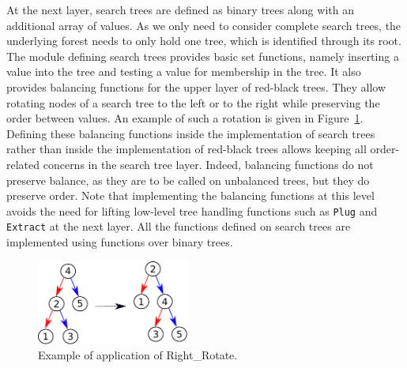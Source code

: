 \documentclass{llncs}
\begin{document}
At the next layer, search trees are defined as binary trees along with an
additional array of values. As we only need to consider complete search trees,
the underlying forest needs to only hold one tree, which is identified through
its root. The module defining search trees provides basic set functions, namely
inserting a value into the tree and testing a value for membership in the
tree. It also provides balancing functions for the upper layer of red-black
trees. They allow rotating nodes of a search tree to the left or to the right
while preserving the order between values. An example of such a rotation is
given in Figure~\ref{fig-search-rot}.  Defining these balancing functions
inside the implementation of search trees rather than inside the implementation
of red-black trees allows keeping all order-related concerns in the search tree
layer. Indeed, balancing functions do not preserve balance, as they are to be
called on unbalanced trees, but they do preserve order. Note that implementing
the balancing functions at this level avoids the need for lifting low-level
tree handling functions such as \texttt{Plug} and \texttt{Extract} at the next
layer. All the functions defined on search trees are implemented using
functions over binary trees.




\begin{figure}[ht]
\begin{center}
\includegraphics[width=5cm]{rotate_right.pdf}
\caption{\label{fig-search-rot} Example of application of Right\_Rotate.}
\end{center}
\end{figure}
\end{document}
